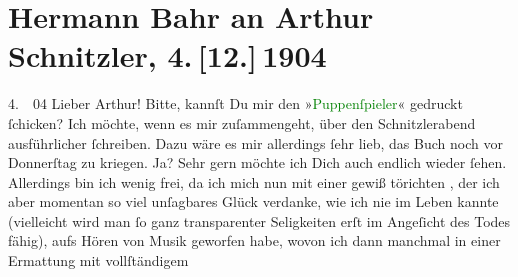 

               \section[Hermann Bahr an Arthur Schnitzler, 4. {[}12.{]} 1904]{ Hermann Bahr an Arthur Schnitzler, 4. {[}12.{]} 1904}\nopagebreak{}\rehead{ }\normalsize\beginnumbering{} \toendnotes[C]{\smallbreak\pagebreak[2]} 
\toendnotes[C]{\smallbreak}\pstart
           \raggedleft{}{\pb}4. \label{T_L01474_1v}\label{T_L01474_1h} 04\pend
           \pstart\center{}Lieber Arthur!\pend\pstart
           Bitte, kannſt Du mir den »\textcolor{green}{Puppenſpieler}{}\ledrightnote{\textcolor{green}{Der Puppenspieler}}« gedruckt
               ſchicken? Ich möchte, wenn es mir zuſammengeht, über den Schnitzlerabend
               ausführlicher ſchreiben. Dazu wäre es mir allerdings ſehr lieb, das Buch noch vor
               Donnerſtag zu kriegen. Ja?\pend
           \pstart
           Sehr gern möchte ich Dich auch endlich wieder ſehen. Allerdings bin ich wenig frei,
               da ich mich nun mit einer gewiß törichten \label{K_L01474_1v}\label{K_L01474_1h}, der ich aber momentan so viel
               unſagbares Glück verdanke, wie ich nie im Leben kannte (\label{LL286-1v}vielleicht wird man ſo ganz transparenter Seligkeiten erſt im
                  Angeſicht des Todes fähig\label{LL286-1h}), aufs Hören von Musik geworfen habe, wovon ich
               dann manchmal in einer Ermattung mit {\pb}vollſtändigem
